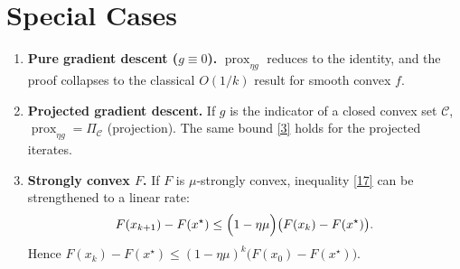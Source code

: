 \documentclass{article}
\newcommand{\prox}{\operatorname{prox}}
\begin{document}
\section*{Special Cases}
\begin{enumerate}
  \item \textbf{Pure gradient descent ($g\equiv0$).}  
        $\prox_{\eta g}$ reduces to the identity, and the proof collapses to the classical $O(1/k)$ result for smooth convex $f$.
  \item \textbf{Projected gradient descent.}  
        If $g$ is the indicator of a closed convex set $\mathcal{C}$,
        $\prox_{\eta g}= \Pi_{\mathcal{C}}$ (projection). The same bound \eqref{3} holds for the projected iterates.
  \item \textbf{Strongly convex $F$.}  
        If $F$ is $\mu$‑strongly convex, inequality \eqref{17} can be strengthened to a linear rate:
        \[
        F(x_{k+1})-F(x^{\star})\le\Bigl(1-\eta\mu\Bigr)\bigl(F(x_{k})-F(x^{\star})\bigr).
        \]
        Hence $F(x_{k})-F(x^{\star})\le(1-\eta\mu)^{k}\bigl(F(x_{0})-F(x^{\star})\bigr)$.
\end{enumerate}
\end{document}

